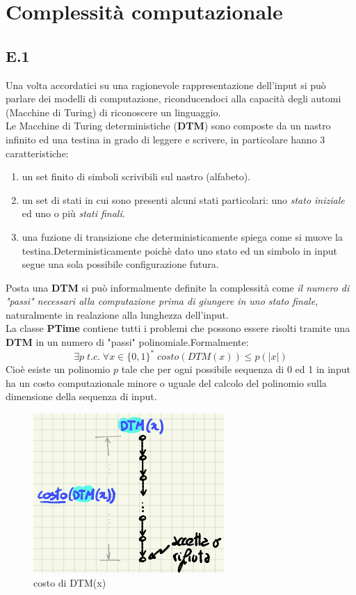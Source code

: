 \documentclass[a4paper]{article}
\begin{document}
\section{Complessità computazionale}
\subsection{E.1}
Una volta accordatici su una ragionevole rappresentazione dell'input si può parlare dei modelli di computazione, riconducendoci alla capacità degli automi (Macchine di Turing) di riconoscere un linguaggio.\\
Le Macchine di Turing deterministiche (\textbf{DTM}) sono composte da un nastro infinito ed una testina in grado di leggere e scrivere, in particolare hanno 3 caratteristiche:
\begin{enumerate}
	\item un set finito di simboli scrivibili sul nastro (alfabeto).
	\item un set di stati in cui sono presenti alcuni stati particolari: uno \textit{stato iniziale} ed uno o più \textit{stati finali}.
	\item una fuzione di transizione che deterministicamente spiega come si muove la testina.Deterministicamente poichè dato uno stato ed un simbolo in input segue una sola possibile configurazione futura.
\end{enumerate}
Posta una \textbf{DTM} si può informalmente definite la complessità come \textit{il numero di "passi" necessari alla computazione prima di giungere in uno stato finale}, naturalmente in realazione alla lunghezza dell'input.\\
La classe \textbf{PTime} contiene tutti i problemi che possono essere risolti tramite una \textbf{DTM} in un numero di "passi" polinomiale.Formalmente: $$\exists p \; t.c. \; \forall x \in \{0,1\}^* \; costo(DTM(x)) \leq p(\lvert x \rvert)$$
Cioè esiste un polinomio $p$ tale che per ogni possibile sequenza di 0 ed 1 in input ha un costo computazionale minore o uguale del calcolo del polinomio sulla dimensione della sequenza di input.
\begin{figure}[!ht]
\centering
\includegraphics[scale = 0.5]{./img/E1_DTM.png}
\caption{costo di DTM(x)} \label{FIG:E1_DTM}
\end{figure}\\
\end{document}
